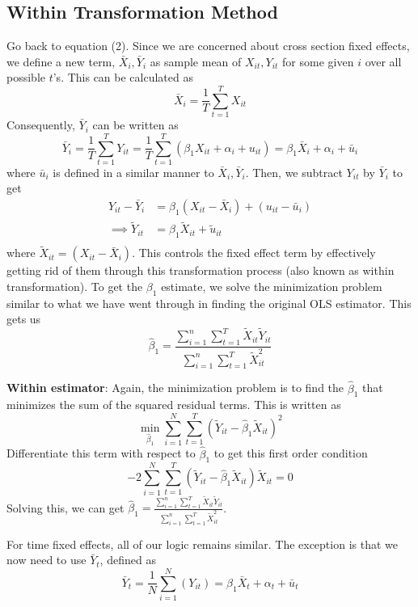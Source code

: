\subsection{Within Transformation Method}
Go back to equation (2). Since we are concerned about cross section fixed effects, we define a new term, $\bar{X}_i, \bar{Y}_i$ as sample mean of $X_{it}, Y_{it}$ for some given $i$ over all possible $t$'s. This can be calculated as
\[
\bar{X}_i = \frac{1}{T}\sum_{t=1}^TX_{it}
\]
Consequently, $\bar{Y}_i$ can be written as
\[
\bar{Y}_i = \frac{1}{T}\sum_{t=1}^TY_{it}=\frac{1}{T}\sum_{t=1}^T\left(\beta_1 X_{it} +\alpha_i +u_{it}\right)=\beta_1 \bar{X}_i +\alpha_i + \bar{u}_{i}
\]
where $\bar{u}_i$ is defined in a similar manner to $\bar{X}_i, \bar{Y}_i$. Then, we subtract $Y_{it}$ by $\bar{Y}_i$ to get
\[
\begin{aligned}
Y_{it}-\bar{Y}_i &= \beta_1(X_{it}-\bar{X}_i) + (u_{it}-\bar{u}_i)\\
\implies \tilde{Y}_{it}&= \beta_1 \tilde{X}_{it}+\tilde{u}_{it}\\
\end{aligned}
\]
where $\tilde{X}_{it}= (X_{it}-\bar{X}_i)$. This controls the fixed effect term by effectively getting rid of them through this transformation process (also known as within transformation). To get the $\beta_1$ estimate, we solve the minimization problem similar to what we have went through in finding the original OLS estimator. This gets us
\[
\hat{\beta}_1= \frac{\sum_{i=1}^n \sum_{t=1}^T \tilde{X}_{it}\tilde{Y}_{it}}{\sum_{i=1}^n \sum_{t=1}^T \tilde{X}_{it}^2}
\]
\begin{mdframed}[backgroundcolor =blue!10]
\textbf{Within estimator}: Again, the minimization problem is to find the $\hat{\beta}_1$ that minimizes the sum of the squared residual terms. This is written as
\[
\min_{\hat{\beta}_1} \sum_{i=1}^N \sum_{t=1}^T (\tilde{Y}_{it}-\hat{\beta}_1 \tilde{X}_{it})^2
\]
Differentiate this term with respect to $\hat{\beta}_1$ to get this first order condition
\[
-2\sum_{i=1}^N \sum_{t=1}^T (\tilde{Y}_{it}-\hat{\beta}_1 \tilde{X}_{it})\tilde{X}_{it}=0
\]
Solving this, we can get $\hat{\beta}_1= \frac{\sum_{i=1}^n \sum_{t=1}^T \tilde{X}_{it}\tilde{Y}_{it}}{\sum_{i=1}^n \sum_{t=1}^T \tilde{X}_{it}^2}$. 
\end{mdframed} \par\medskip
For time fixed effects, all of our logic remains similar. The exception is that we now need to use $\bar{Y}_t$, defined as
\[
\bar{Y}_t = \frac{1}{N}\sum_{i=1}^N(Y_{it}) = \beta_1 \bar{X}_t +\alpha_t +\bar{u}_t
\]
